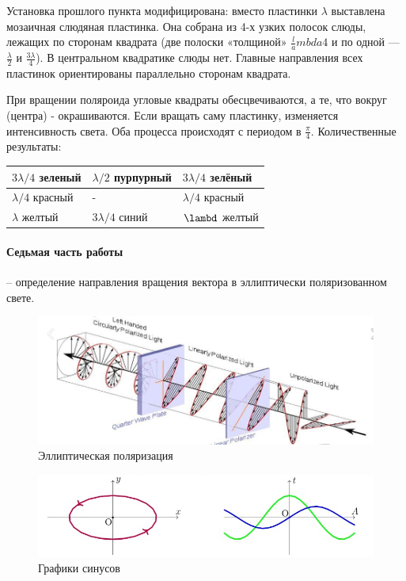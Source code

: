Установка прошлого пункта модифицирована: вместо пластинки $\lambda$ выставлена  мозаичная слюдяная пластинка. Она собрана из 4-х узких полосок слюды, лежащих по сторонам квадрата (две полоски «толщиной» $\frac lambda 4$ и по одной — $\frac \lambda 2$ и $\frac{3\lambda}{4}$). В центральном квадратике слюды нет. Главные направления всех пластинок ориентированы параллельно сторонам квадрата.

При вращении поляроида угловые квадраты обесцвечиваются, а те, что вокруг (центра) - окрашиваются. Если вращать саму пластинку, изменяется интенсивность света. Оба процесса происходят с периодом в $\frac \pi 4$. Количественные результаты:

\begin{table}[!ht]
    \centering
    \begin{tabular}{|l|l|l|}
    \hline
        $3 \lambda / 4$ зеленый & $\lambda / 2$ пурпурный & $3 \lambda / 4$ зелёный \\ \hline
        $\lambda / 4$ красный   & -                       & $\lambda / 4$ красный \\  \hline
        $\lambda $ желтый       & $3 \lambda / 4$ синий   & $\lambd $ желтый \\ \hline
    \end{tabular}
\end{table}

\paragraph{Седьмая часть работы} -- определение направления вращения вектора в эллиптически поляризованном свете.

\begin{figure}[!ht]
	\centering
	\includegraphics[width=0.5\linewidth]{pics/3D.png}
	\caption{Эллиптическая поляризация}
	\label{fig:3d}
\end{figure}

\begin{figure}[!ht]
	\centering
	\includegraphics[width=0.5\linewidth]{pics/ellipses.png}
	\caption{Графики синусов}%
	\label{fig:ellipses}
\end{figure}

